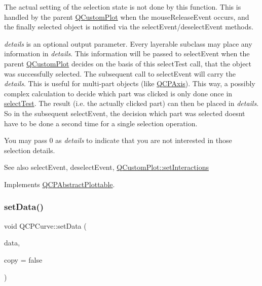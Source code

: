 The actual setting of the selection state is not done by this function. This is handled by the parent \mbox{\hyperlink{class_q_custom_plot}{Q\+Custom\+Plot}} when the mouse\+Release\+Event occurs, and the finally selected object is notified via the select\+Event/deselect\+Event methods.

{\itshape details} is an optional output parameter. Every layerable subclass may place any information in {\itshape details}. This information will be passed to select\+Event when the parent \mbox{\hyperlink{class_q_custom_plot}{Q\+Custom\+Plot}} decides on the basis of this select\+Test call, that the object was successfully selected. The subsequent call to select\+Event will carry the {\itshape details}. This is useful for multi-\/part objects (like \mbox{\hyperlink{class_q_c_p_axis}{Q\+C\+P\+Axis}}). This way, a possibly complex calculation to decide which part was clicked is only done once in \mbox{\hyperlink{class_q_c_p_curve_a87a9fb34a2a48dcae4c1245ada235e7d}{select\+Test}}. The result (i.\+e. the actually clicked part) can then be placed in {\itshape details}. So in the subsequent select\+Event, the decision which part was selected doesn\textquotesingle{}t have to be done a second time for a single selection operation.

You may pass 0 as {\itshape details} to indicate that you are not interested in those selection details.

\begin{DoxySeeAlso}{See also}
select\+Event, deselect\+Event, \mbox{\hyperlink{class_q_custom_plot_a5ee1e2f6ae27419deca53e75907c27e5}{Q\+Custom\+Plot\+::set\+Interactions}} 
\end{DoxySeeAlso}


Implements \mbox{\hyperlink{class_q_c_p_abstract_plottable_a38efe9641d972992a3d44204bc80ec1d}{Q\+C\+P\+Abstract\+Plottable}}.

\mbox{\label{class_q_c_p_curve_a631ac886708460013b30052f49cbc9da}} 
\subsubsection{\texorpdfstring{set\+Data()}{setData()}\hspace{0.1cm}{\footnotesize\ttfamily [1/3]}}
{\footnotesize\ttfamily void Q\+C\+P\+Curve\+::set\+Data (\begin{DoxyParamCaption}\item[{\mbox{\hyperlink{qcustomplot_8h_a444d37ec9cb2951b3a7fe443c34d1658}{Q\+C\+P\+Curve\+Data\+Map}} $\ast$}]{data,  }\item[{bool}]{copy = {\ttfamily false} }\end{DoxyParamCaption})}

